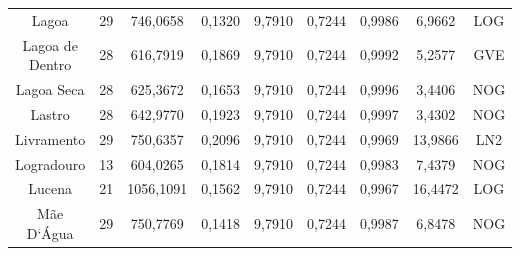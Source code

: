 \begin{table}[ht]
\begin{tabular}{ccccccccc}
Lagoa & 29 & 746,0658 & 0,1320 & 9,7910 & 0,7244 & 0,9986 & 6,9662 & LOG \\
Lagoa de Dentro & 28 & 616,7919 & 0,1869 & 9,7910 & 0,7244 & 0,9992 & 5,2577 & GVE \\
Lagoa Seca & 28 & 625,3672 & 0,1653 & 9,7910 & 0,7244 & 0,9996 & 3,4406 & NOG \\
Lastro & 28 & 642,9770 & 0,1923 & 9,7910 & 0,7244 & 0,9997 & 3,4302 & NOG \\
Livramento & 29 & 750,6357 & 0,2096 & 9,7910 & 0,7244 & 0,9969 & 13,9866 & LN2 \\
Logradouro & 13 & 604,0265 & 0,1814 & 9,7910 & 0,7244 & 0,9983 & 7,4379 & NOG \\
Lucena & 21 & 1056,1091 & 0,1562 & 9,7910 & 0,7244 & 0,9967 & 16,4472 & LOG \\
Mãe D`Água & 29 & 750,7769 & 0,1418 & 9,7910 & 0,7244 & 0,9987 & 6,8478 & NOG \\ \hline
\end{tabular}
\end{table}

\newpage


